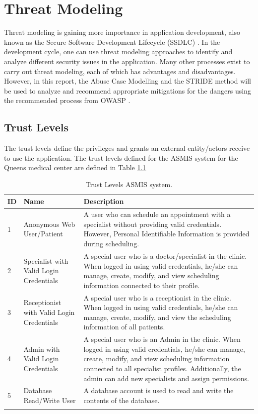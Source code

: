 \chapter{Threat Modeling}
Threat modeling is gaining more importance in application development, also known as the Secure Software Development Lifecycle (SSDLC) \citep{snyk_2022}. In the development cycle, one can use threat modeling approaches to identify and analyze different security issues in the application. Many other processes exist to carry out threat modeling, each of which has advantages and disadvantages. However, in this report, the Abuse Case Modelling and the STRIDE method will be used to analyze and recommend appropriate mitigations for the dangers using the recommended process from OWASP \citep{owasp_threat_model_process}.



\section{Trust Levels}
The trust levels define the privileges and grants an external entity/actors receive to use the application. The trust levels defined for the ASMIS system for the Queens medical center are defined in Table \ref{table:trust_levels}

\begingroup
\centering
\setlength{\tabcolsep}{6.5pt} %
\renewcommand{\arraystretch}{1.8} %
\begin{longtable}{ |p{1cm}|p{6cm}|p{8cm}|}
 \hline
 \textbf{ID} & \textbf{Name} & \textbf{Description} \\ [0.5ex] 
 \hline
 1 & Anonymous Web User/Patient & A user who can schedule an appointment with a specialist without providing valid credentials. However, Personal Identifiable Information is provided during scheduling. \\
 \hline
 2 & Specialist with Valid Login Credentials & A special user who is a doctor/specialist in the clinic. When logged in using valid credentials, he/she can manage, create, modify, and view scheduling information connected to their profile. \\
 \hline
 3 & Receptionist with Valid Login Credentials & A special user who is a receptionist in the clinic. When logged in using valid credentials, he/she can manage, create, modify, and view the scheduling information of all patients. \\
 \hline
 4 & Admin with Valid Login Credentials & A special user who is an Admin in the clinic. When logged in using valid credentials, he/she can manage, create, modify, and view scheduling information connected to all specialist profiles. Additionally, the admin can add new specialists and assign permissions.\\
 \hline
 5 & Database Read/Write User & A database account is used to read and write the contents of the database.  \\ [1ex]
 \hline
\caption{Trust Levels ASMIS system.}
\label{table:trust_levels}
\end{longtable}
\endgroup

